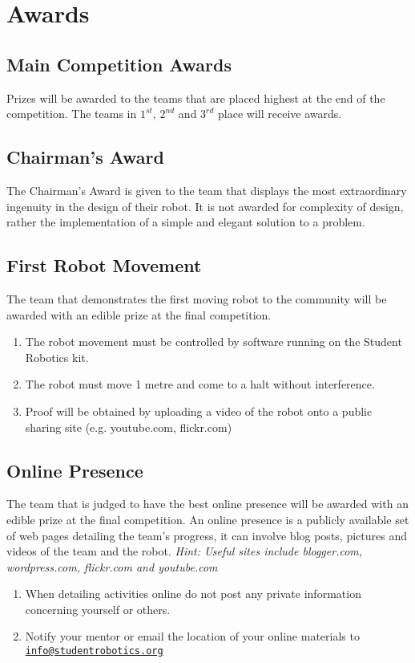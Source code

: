 \section {Awards}
\label{sec:Awards}

\subsection{Main Competition Awards}
Prizes will be awarded to the teams that are placed highest at the end of the competition.  The teams in $1^{st}$, $2^{nd}$ and $3^{rd}$ place will receive awards.

\subsection{Chairman's Award}
The Chairman's Award is given to the team that displays the most extraordinary ingenuity in the design of their robot. It is not awarded for complexity of design, rather the implementation of a simple and elegant solution to a problem.

\subsection{First Robot Movement}
The team that demonstrates the first moving robot to the community will be awarded with an edible prize at the final competition.
\begin{enumerate}
\item The robot movement must be controlled by software running on the Student Robotics kit.
\item The robot must move 1 metre and come to a halt without interference.
\item Proof will be obtained by uploading a video of the robot onto a public sharing site (e.g. youtube.com, flickr.com)
\end{enumerate}


\subsection{Online Presence}
The team that is judged to have the best online presence will be awarded with an edible prize at the final competition.  An online presence is a publicly available set of web pages detailing the team's progress, it can involve blog posts, pictures and videos of the team and the robot.  \emph{Hint: Useful sites include blogger.com, wordpress.com, flickr.com and youtube.com}
\begin{enumerate}
\item When detailing activities online do not post any private information concerning yourself or others.
\item Notify your mentor or email the location of your online materials to \linebreak\href{mailto:info@studentrobotics.org}{\nolinkurl{info@studentrobotics.org}}
\end{enumerate}
